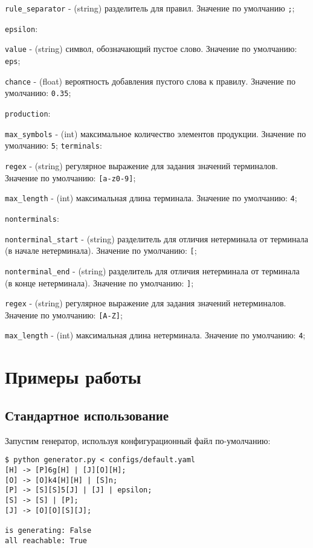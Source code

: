 \documentclass{article}
\begin{document}
\verb|rule_separator| - (string) разделитель для правил. Значение по умолчанию \verb|;|;

\verb|epsilon|:

\verb|value| - (string) символ, обозначающий пустое слово. Значение по умолчанию: \verb|eps|;

\verb|chance| - (float) вероятность добавления пустого слова к правилу. Значение по умолчанию: \verb|0.35|;

\verb|production|:

\verb|max_symbols| - (int) максимальное количество элементов продукции. Значение по умолчанию: \verb|5|;
\verb|terminals|:

\verb|regex| - (string) регулярное выражение для задания значений терминалов. Значение по умолчанию: \verb|[a-z0-9]|;

\verb|max_length| - (int) максимальная длина терминала. Значение по умолчанию: \verb|4|;

\verb|nonterminals|:

\verb|nonterminal_start| - (string) разделитель для отличия нетерминала от терминала (в начале нетерминала). Значение по умолчанию: \verb|[|;

\verb|nonterminal_end| - (string) разделитель для отличия нетерминала от терминала (в конце нетерминала). Значение по умолчанию: \verb|]|;

\verb|regex| - (string) регулярное выражение для задания значений  нетерминалов. Значение по умолчанию: \verb|[A-Z]|;

\verb|max_length| - (int) максимальная длина нетерминала. Значение по умолчанию: \verb|4|;

\section{Примеры работы}

\subsection{Стандартное использование}
Запустим генератор, используя конфигурационный файл по-умолчанию:

\begin{lstlisting}
$ python generator.py < configs/default.yaml
[H] -> [P]6g[H] | [J][O][H];
[O] -> [O]k4[H][H] | [S]n;
[P] -> [S][S]5[J] | [J] | epsilon;
[S] -> [S] | [P];
[J] -> [O][O][S][J];

is generating: False
all reachable: True
\end{lstlisting}
\end{document}
